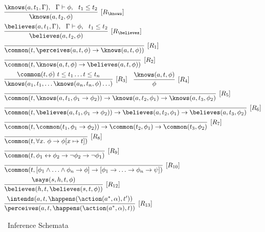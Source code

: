 \begin{figure}[h]
\begin{mdframed}[nobreak=true, roundcorner=8pt, frametitlealignment=\centering]
\begin{equation*}
\begin{aligned}
  &\infer[{[R_{\knows}]}]{\knows(a,t_2,\phi)}{\knows(a,t_1,\Gamma), \
    \ \Gamma\vdash\phi, \ \ t_1 \leq t_2} \\
& \infer[{[R_{\believes}]}]{\believes(a,t_2,\phi)}{\believes(a,t_1,\Gamma), \
    \ \Gamma\vdash\phi, \ \ t_1 \leq t_2} \\
& \infer[{[R_1]}]{\common(t,\perceives(a,t,\phi) \lif\knows(a,t,\phi))}{}\\
&  \infer[{[R_2]}]{\common(t,\knows(a,t,\phi)
    \lif\believes(a,t,\phi))}{}\\
  &\infer[{[R_3]}]{\knows(a_1, t_1, \ldots
    \knows(a_n,t_n,\phi)\ldots)}{\common(t,\phi) \ t\leq t_1 \ldots t\leq
    t_n}\hspace{10pt}
  \infer[{[R_4]}]{\phi}{\knows(a,t,\phi)}\\
  & \infer[{[R_5]}]{\common(t,\knows(a,t_1,\phi_1\lif\phi_2))
    \lif \knows(a,t_2,\phi_1) \lif \knows(a,t_3,\phi_2)}{}\\
& \infer[{[R_6]}]{\common(t,\believes(a,t_1,\phi_1\lif\phi_2))
    \lif \believes(a,t_2,\phi_1) \lif \believes(a,t_3,\phi_2)}{}\\
& \infer[{[R_7]}]{\common(t,\common(t_1,\phi_1\lif\phi_2))
    \lif \common(t_2,\phi_1) \lif \common(t_3,\phi_2)}{} \\
& \infer[{[R_8]}]{\common(t, \forall x. \  \phi \lif \phi[x\mapsto
  t])}{} \\
& \infer[{[R_9]}]{\common(t,\phi_1 \liff \phi_2 \lif \neg
    \phi_2 \lif \neg \phi_1)}{}\\
& \infer[{[R_{10}]}] {\common(t,[\phi_1\land\ldots\land\phi_n\lif\phi]
  \lif [\phi_1\lif\ldots\lif\phi_n\lif\psi])}{}\\
& \infer[{[R_{12}]}]{\believes(h,t,\believes(s,t,\phi))}{\says(s,h,t,\phi)} \\
& \infer[{[R_{13}]}]{\perceives(a,t,\happens(\action(a^\ast,\alpha),t))}{\intends(a,t,\happens(\action(a^\ast,\alpha),t'))}
\end{aligned}
\end{equation*}
\end{mdframed}
\caption{\CEC\ Inference Schemata}
\label{fig:cec_schemata}
\end{figure}

